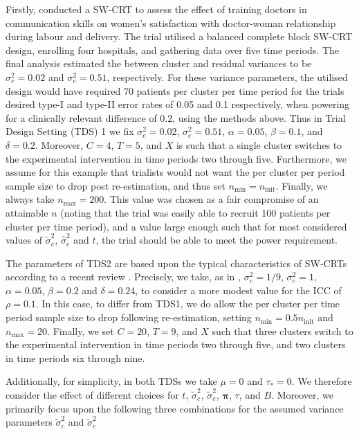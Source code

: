 \documentclass{article}
\begin{document}
Firstly, \citet{bashour2013} conducted a SW-CRT to assess the effect of training doctors in communication skills on women's satisfaction with doctor-woman relationship during labour and delivery. The trial utilised a balanced complete block SW-CRT design, enrolling four hospitals, and gathering data over five time periods. The final analysis estimated the between cluster and residual variances to be $\sigma_c^2=0.02$ and $\sigma_e^2=0.51$, respectively. For these variance parameters, the utilised design would have required 70 patients per cluster per time period for the trials desired type-I and type-II error rates of 0.05 and 0.1 respectively, when powering for a clinically relevant difference of 0.2, using the methods above. Thus in Trial Design Setting (TDS) 1 we fix $\sigma_c^2=0.02$, $\sigma_e^2=0.51$, $\alpha=0.05$, $\beta=0.1$, and $\delta=0.2$. Moreover, $C=4$, $T=5$, and $X$ is such that a single cluster switches to the experimental intervention in time periods two through five. Furthermore, we assume for this example that trialists would not want the per cluster per period sample size to drop post re-estimation, and thus set $n_\text{min}=n_\text{init}$. Finally, we always take $n_\text{max}=200$. This value was chosen as a fair compromise of an attainable $n$ (noting that the trial was easily able to recruit 100 patients per cluster per time period), and a value large enough such that for most considered values of $\tilde{\sigma}_c^2$, $\hat{\sigma}_e^2$ and $t$, the trial should be able to meet the power requirement.

The parameters of TDS2 are based upon the typical characteristics of SW-CRTs according to a recent review \citep{grayling2017}. Precisely, we take, as in \citet{grayling2017b}, $\sigma_c^2=1/9$, $\sigma_e^2=1$, $\alpha=0.05$, $\beta=0.2$ and $\delta=0.24$, to consider a more modest value for the ICC of $\rho=0.1$. In this case, to differ from TDS1, we do allow the per cluster per time period sample size to drop following re-estimation, setting $n_\text{min}=0.5n_\text{init}$ and $n_\text{max}=20$. Finally, we set $C=20$, $T=9$, and $X$ such that three clusters switch to the experimental intervention in time periods two through five, and two clusters in time periods six through nine.

Additionally, for simplicity, in both TDSs we take $\mu=0$ and $\tau_*=0$. We therefore consider the effect of different choices for $t$, $\tilde{\sigma}_c^2$, $\tilde{\sigma}_e^2$, $\boldsymbol{\pi}$, $\tau$, and $B$. Moreover, we primarily focus upon the following three combinations for the assumed variance parameters $\tilde{\sigma}_c^2$ and $\tilde{\sigma}_e^2$
\end{document}

